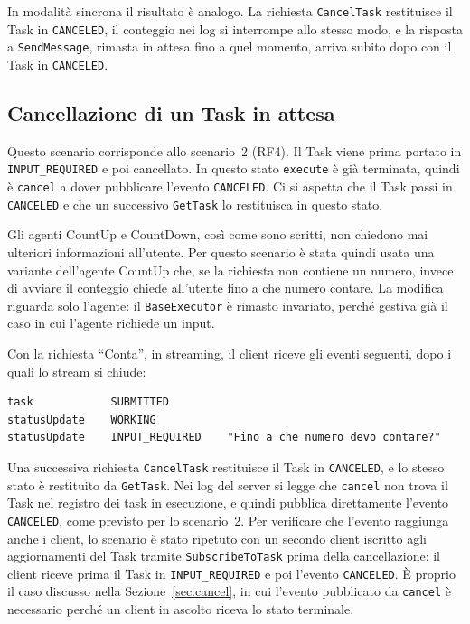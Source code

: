 In modalità sincrona il risultato è analogo. La richiesta \texttt{CancelTask} restituisce il Task in \texttt{CANCELED}, il conteggio nei log si interrompe allo stesso modo, e la risposta a \texttt{SendMessage}, rimasta in attesa fino a quel momento, arriva subito dopo con il Task in \texttt{CANCELED}.

\subsection{Cancellazione di un Task in attesa}

Questo scenario corrisponde allo scenario~2 (RF4). Il Task viene prima portato in \texttt{INPUT\_REQUIRED} e poi cancellato. In questo stato \texttt{execute} è già terminata, quindi è \texttt{cancel} a dover pubblicare l'evento \texttt{CANCELED}. Ci si aspetta che il Task passi in \texttt{CANCELED} e che un successivo \texttt{GetTask} lo restituisca in questo stato.

Gli agenti CountUp e CountDown, così come sono scritti, non chiedono mai ulteriori informazioni all'utente. Per questo scenario è stata quindi usata una variante dell'agente CountUp che, se la richiesta non contiene un numero, invece di avviare il conteggio chiede all'utente fino a che numero contare. La modifica riguarda solo l'agente: il \texttt{BaseExecutor} è rimasto invariato, perché gestiva già il caso in cui l'agente richiede un input.

Con la richiesta ``Conta'', in streaming, il client riceve gli eventi seguenti, dopo i quali lo stream si chiude:

\begin{center}
\begin{minipage}{0.95\linewidth}
\footnotesize
\begin{verbatim}
task            SUBMITTED
statusUpdate    WORKING
statusUpdate    INPUT_REQUIRED    "Fino a che numero devo contare?"
\end{verbatim}
\end{minipage}
\end{center}

Una successiva richiesta \texttt{CancelTask} restituisce il Task in \texttt{CANCELED}, e lo stesso stato è restituito da \texttt{GetTask}. Nei log del server si legge che \texttt{cancel} non trova il Task nel registro dei task in esecuzione, e quindi pubblica direttamente l'evento \texttt{CANCELED}, come previsto per lo scenario~2. Per verificare che l'evento raggiunga anche i client, lo scenario è stato ripetuto con un secondo client iscritto agli aggiornamenti del Task tramite \texttt{SubscribeToTask} prima della cancellazione: il client riceve prima il Task in \texttt{INPUT\_REQUIRED} e poi l'evento \texttt{CANCELED}. È proprio il caso discusso nella Sezione~\ref{sec:cancel}, in cui l'evento pubblicato da \texttt{cancel} è necessario perché un client in ascolto riceva lo stato terminale.

